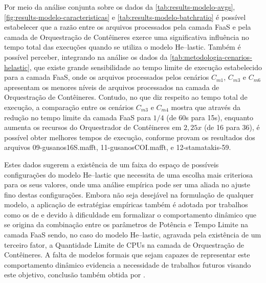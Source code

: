 \documentclass[english,brazilian]{UNISINOSmonografia} %
\begin{document}
Por meio da análise conjunta sobre os dados da \autoref{tab:results-modelo-avgs}, \autoref{fig:results-modelo-caracteristicas} e \autoref{tab:results-modelo-batchratio} é possível estabelecer que a razão entre os arquivos processados pela camada FaaS e pela camada de Orquestração de Contêineres exerce uma significativa influência no tempo total das execuções quando se utiliza o modelo \textsf{He}--lastic.
%
Também é possível perceber, integrando na análise os dados da \autoref{tab:metodologia-cenarios-helastic}, que existe grande sensibilidade ao tempo limite de execução estabelecido para a camada FaaS, onde os arquivos processados pelos cenários $C_{m1}$, $C_{m3}$ e $C_{m6}$ apresentam os menores níveis de arquivos processados na camada de Orquestração de Contêineres.
%
Contudo, no que diz respeito ao tempo total de execução, a comparação entre os cenários $C_{m3}$ e $C_{m4}$ mostra que através da redução no tempo limite da camada FaaS para $1/4$ (de 60s para 15s), enquanto aumenta os recursos do Orquestrador de Contêineres em $2,25x$ (de 16 para 36), é possível obter melhores tempos de execução, conforme provam os resultados dos arquivos 09-gusanos16S.mafft, 11-gusanosCOI.mafft, e 12-stamatakis-59.



Estes dados sugerem a existência de um faixa do espaço de possíveis configurações do modelo \textsf{He}--lastic que necessita de uma escolha mais criteriosa para os seus valores, onde uma análise empírica pode ser uma aliada no ajuste fino destas configurações.
%
Embora não seja desejável na formulação de qualquer modelo, a aplicação de estratégias empíricas também é adotada por trabalhos como os de  e  devido à dificuldade em formalizar o comportamento dinâmico que se origina da combinação entre os parâmetros de Potência e Tempo Limite na camada FaaS sendo, no caso do modelo \textsf{He}--lastic, agravada pela existência de um terceiro fator, a Quantidade Limite de CPUs na camada de Orquestração de Contêineres.
%
A falta de modelos formais que sejam capazes de representar este comportamento dinâmico evidencia a necessidade de trabalhos futuros visando este objetivo, conclusão também obtida por .
\end{document}

